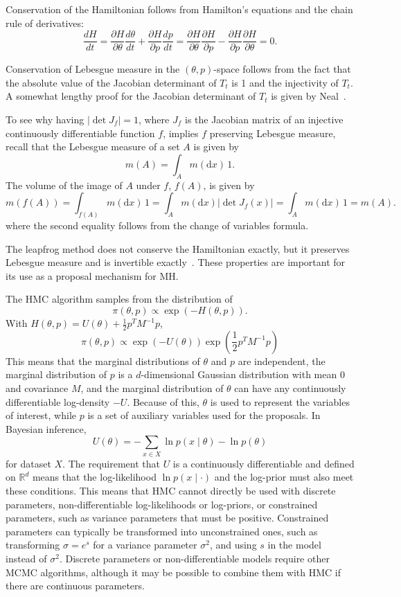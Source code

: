 \documentclass[english,twoside,openright]{HYgraduMLDS}
\newcommand{\R}{\mathbb{R}}
\newcommand{\dx}{\mathrm{d}}
\begin{document}
Conservation of the Hamiltonian follows from Hamilton's equations and the 
chain rule of derivatives:
\[
    \frac{dH}{dt} = \frac{\partial H}{\partial \theta}\frac{d \theta}{dt}
    + \frac{\partial H}{\partial p}\frac{dp}{dt}
    = \frac{\partial H}{\partial \theta}\frac{\partial H}{\partial p}
    - \frac{\partial H}{\partial p}\frac{\partial H}{\partial \theta}
    = 0.
\]

Conservation of Lebesgue measure in the \((\theta, p)\)-space follows
from the fact that 
the absolute value of the Jacobian determinant of \(T_t\) is 1 and the 
injectivity of \(T_t\). A somewhat 
lengthy proof for the Jacobian determinant of \(T_t\) is given by
Neal~\cite{neal2012mcmc}. 

To see why 
having \(|\det J_f| = 1\), where \(J_f\) is the Jacobian matrix of an injective 
continuously differentiable function \(f\), 
implies \(f\) preserving Lebesgue measure, recall that the Lebesgue measure of a set
\(A\) is given by 
\[
    m(A) = \int_A m(\dx x)\, 1.
\]
The volume of the image of \(A\) under \(f\), \(f(A)\), is given by
\[
  m(f(A)) = \int_{f(A)}m(\dx x)\,1
  = \int_{A}m(\dx x)|\det J_f(x)| = \int_A m(\dx x)\,1
  = m(A).
\]
where the second equality follows from the change of variables formula.

The leapfrog method does not conserve the Hamiltonian exactly, but it 
preserves Lebesgue measure and is invertible exactly~\cite{neal2012mcmc}.
These properties are important for its use as a proposal mechanism for MH.

The HMC algorithm samples from the distribution of~\cite{neal2012mcmc}
\[
    \pi(\theta, p) \propto \exp(-H(\theta, p)).
\]
With \(H(\theta, p) = U(\theta) + \frac{1}{2}p^{T}M^{-1}p\),
\[
    \pi(\theta, p) \propto \exp(-U(\theta))\exp\left(\frac{1}{2}p^{T}M^{-1}p\right)
\]
This means that the marginal distributions of \(\theta\) and \(p\) are 
independent, the marginal distribution of \(p\) is a \(d\)-dimensional
Gaussian distribution 
with mean 0 and covariance \(M\), and the marginal distribution of
\(\theta\) can have any continuously differentiable log-density \(-U\).
Because of this, \(\theta\) is used to represent the variables of interest,
while \(p\) is a set of auxiliary variables used for the proposals.
In Bayesian inference,
\[
  U(\theta) = -\sum_{x\in X}\ln p(x\mid \theta) - \ln p(\theta)
\]
for dataset \(X\). The requirement that \(U\) is a continuously differentiable
and defined on \(\R^{d}\) means that the log-likelihood \(\ln p(x\mid \cdot)\)
and the log-prior must also meet these conditions. This means that HMC cannot directly
be used with discrete parameters, non-differentiable log-likelihoods or log-priors,
or constrained parameters, such as variance
parameters that must be positive. Constrained parameters can typically be
transformed into unconstrained ones, such as transforming \(\sigma = e^{s}\)
for a variance parameter \(\sigma^{2}\), and using \(s\) in the model instead
of \(\sigma^{2}\). Discrete parameters or non-differentiable models
require other MCMC algorithms, although it may be possible to combine them
with HMC if there are continuous parameters.
\end{document}
